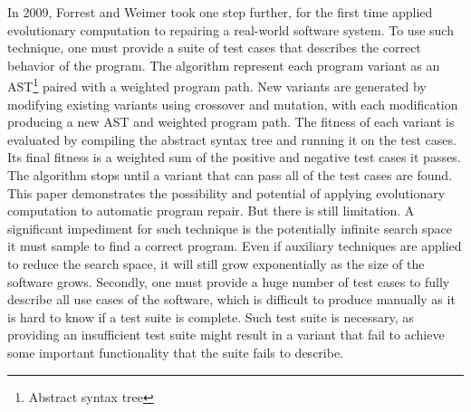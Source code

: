\documentclass[10pt,journal,final,]{article}
\theoremstyle{definition}
\begin{document}
In 2009, Forrest and Weimer took one step further, for the first time applied evolutionary computation to repairing a real-world software system\cite{AGPAtASR,AFPUGP}.
To use such technique, one must provide a suite of test cases that describes the correct behavior of the program. The algorithm represent each program variant as an AST\footnote{Abstract syntax tree} paired with a weighted program path. New variants are generated by modifying existing variants using crossover and mutation, with each modification producing a new AST and weighted program path. The fitness of each variant is evaluated by compiling the abstract syntax tree and running it on the test cases. Its final fitness is a weighted sum of the positive and negative test cases it passes.
The algorithm stops until a variant that can pass all of the test cases are found.
This paper demonstrates the possibility and potential of applying evolutionary computation to automatic program repair.
But there is still limitation.
A significant impediment for such technique is the potentially infinite search space it must sample to find a correct program. Even if auxiliary techniques are applied to reduce the search space,
it will still grow exponentially as the size of the software grows.
Secondly, one must provide a huge number of test cases to fully describe all use cases of the software, which is difficult to produce manually as it is hard to know if a test suite is complete.
Such test suite is necessary, as providing an insufficient test suite might result in a variant that fail to achieve some important functionality that the suite fails to describe.
\end{document}
